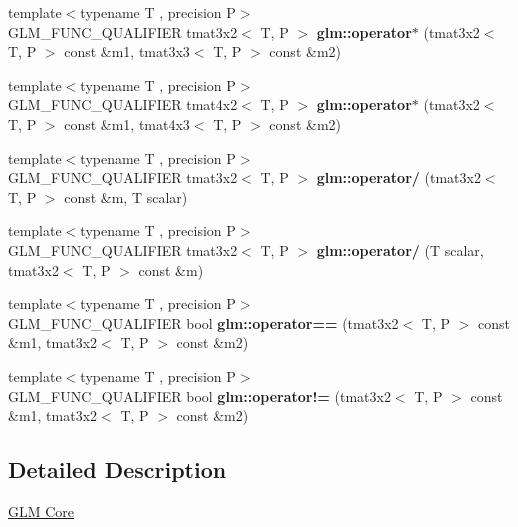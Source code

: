 \begin{DoxyCompactItemize}
\item 
\mbox{\label{type__mat3x2_8inl_aee7ea900a08465c9c1817f53fcbcf7ff}} 
{\footnotesize template$<$typename T , precision P$>$ }\\G\+L\+M\+\_\+\+F\+U\+N\+C\+\_\+\+Q\+U\+A\+L\+I\+F\+I\+ER tmat3x2$<$ T, P $>$ {\bfseries glm\+::operator$\ast$} (tmat3x2$<$ T, P $>$ const \&m1, tmat3x3$<$ T, P $>$ const \&m2)
\item 
\mbox{\label{type__mat3x2_8inl_aa2507681a80e35a140d713d4f82a015f}} 
{\footnotesize template$<$typename T , precision P$>$ }\\G\+L\+M\+\_\+\+F\+U\+N\+C\+\_\+\+Q\+U\+A\+L\+I\+F\+I\+ER tmat4x2$<$ T, P $>$ {\bfseries glm\+::operator$\ast$} (tmat3x2$<$ T, P $>$ const \&m1, tmat4x3$<$ T, P $>$ const \&m2)
\item 
\mbox{\label{type__mat3x2_8inl_a3596f2711520562c4d70fa9f5c532e77}} 
{\footnotesize template$<$typename T , precision P$>$ }\\G\+L\+M\+\_\+\+F\+U\+N\+C\+\_\+\+Q\+U\+A\+L\+I\+F\+I\+ER tmat3x2$<$ T, P $>$ {\bfseries glm\+::operator/} (tmat3x2$<$ T, P $>$ const \&m, T scalar)
\item 
\mbox{\label{type__mat3x2_8inl_a3efe0cc5b299c1cb79ee9232a451d176}} 
{\footnotesize template$<$typename T , precision P$>$ }\\G\+L\+M\+\_\+\+F\+U\+N\+C\+\_\+\+Q\+U\+A\+L\+I\+F\+I\+ER tmat3x2$<$ T, P $>$ {\bfseries glm\+::operator/} (T scalar, tmat3x2$<$ T, P $>$ const \&m)
\item 
\mbox{\label{type__mat3x2_8inl_af31e44ac30f1ebf93cc4324d0cde3050}} 
{\footnotesize template$<$typename T , precision P$>$ }\\G\+L\+M\+\_\+\+F\+U\+N\+C\+\_\+\+Q\+U\+A\+L\+I\+F\+I\+ER bool {\bfseries glm\+::operator==} (tmat3x2$<$ T, P $>$ const \&m1, tmat3x2$<$ T, P $>$ const \&m2)
\item 
\mbox{\label{type__mat3x2_8inl_ab6d7d37966e4c81709adf07b0fd9a9d0}} 
{\footnotesize template$<$typename T , precision P$>$ }\\G\+L\+M\+\_\+\+F\+U\+N\+C\+\_\+\+Q\+U\+A\+L\+I\+F\+I\+ER bool {\bfseries glm\+::operator!=} (tmat3x2$<$ T, P $>$ const \&m1, tmat3x2$<$ T, P $>$ const \&m2)
\end{DoxyCompactItemize}


\subsection{Detailed Description}
\hyperlink{group__core}{G\+LM Core} 